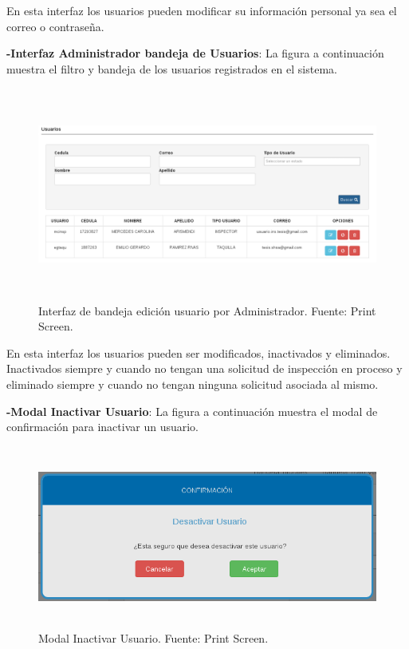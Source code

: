 En esta interfaz los usuarios pueden modificar su información personal ya sea el correo o contraseña.


\textbf{-Interfaz Administrador bandeja de Usuarios}: La figura a continuación muestra el filtro y bandeja de los usuarios registrados en el sistema.

\begin{figure}[H]
\begin{center}
	\includegraphics[width=\textwidth,height=7cm]{img/interfaces/bandeja_edicion_usuarios.png}
\end{center}
\caption{Interfaz de bandeja edición usuario por Administrador. Fuente: Print Screen.}
\label{fig:interfaz_bandeja_edicion_usuario}
\end{figure}

En esta interfaz los usuarios pueden ser modificados, inactivados y eliminados. Inactivados siempre y cuando no tengan una solicitud de inspección en proceso y eliminado siempre y cuando no tengan ninguna solicitud asociada al mismo.



\textbf{-Modal Inactivar Usuario}: La figura a continuación muestra el modal de confirmación para inactivar un usuario.

\begin{figure}[H]
\begin{center}
	\includegraphics[width=14cm,height=6cm]{img/interfaces/modal_inactivar_usuario.png}
\end{center}
\caption{Modal Inactivar Usuario. Fuente: Print Screen.}
\label{fig:modal_confirmacion_inactivar_usuario}
\end{figure}

